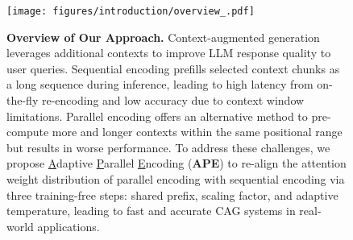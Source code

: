 \begin{figure}[t]
    \centering
    \texttt{[image: figures/introduction/overview\_.pdf]}
    \caption{
    \textbf{Overview of Our Approach.} Context-augmented generation leverages additional contexts to improve LLM response quality to user queries. 
    Sequential encoding prefills selected context chunks as a long sequence during inference, leading to high latency from on-the-fly re-encoding and low accuracy due to context window limitations.
    Parallel encoding offers an alternative method to pre-compute more and longer contexts within the same positional range but results in worse performance.
    To address these challenges, we propose \underline{A}daptive \underline{P}arallel \underline{E}ncoding (\textbf{APE}) to re-align the attention weight distribution of parallel encoding with sequential encoding via three training-free steps: shared prefix, scaling factor, and adaptive temperature, leading to fast and accurate CAG systems in real-world applications.}
    \label{fig:intro}
\end{figure}
